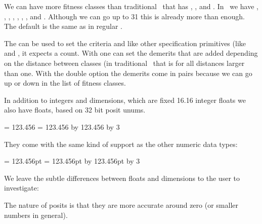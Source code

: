 \stopnewprimitive

\startnewprimitive[title={\prm {fitnessclasses}}]

We can have more fitness classes than traditional \TEX\ that has , ,  and . In \CONTEXT\ we have
, , , ,
, , ,  and
. Although we can go up to 31 this is already more than enough.
The default is the same as in regular \TEX.

The  can be used to set the criteria and like other
specification primitives (like  and , it
expects a count. With  one can set the demerits that are
added depending on the distance between classes (in traditional \TEX\ that is
 for all distances larger than one. With the double option the
demerits come in pairs because we can go up or down in the list of fitness
classes.

\stopnewprimitive

\startnewprimitive[title={\prm {float}}]

In addition to integers and dimensions, which are fixed 16.16 integer floats we
also have  floats, based on 32 bit posit unums.

\startbuffer
{} = 123.456           \the{}
 = 123.456           \the{}
\advance {} by 123.456 \the{}
\advance {} by  \the{}
\divideby{} 3          \the{}
\stopbuffer

\typebuffer

They come with the same kind of support as the other numeric data types:

\startlines \getbuffer \stoplines

\startbuffer
{} = 123.456pt          \the{}
 = 123.456pt          \the{}
\advance {} by 123.456pt \the{}
\advance {} by    \the{}
\divideby{} 3            \the{}
\stopbuffer

We leave the subtle differences between floats and dimensions to the user to
investigate:

\typebuffer

The nature of posits is that they are more accurate around zero (or smaller
numbers in general).

\startlines \getbuffer \stoplines

